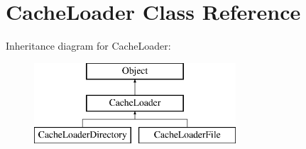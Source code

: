 \hypertarget{class_cache_loader}{\section{Cache\-Loader Class Reference}
\label{class_cache_loader}
}
Inheritance diagram for Cache\-Loader\-:\begin{figure}[H]
\begin{center}
\leavevmode
\includegraphics[height=3.000000cm]{class_cache_loader}
\end{center}
\end{figure}
